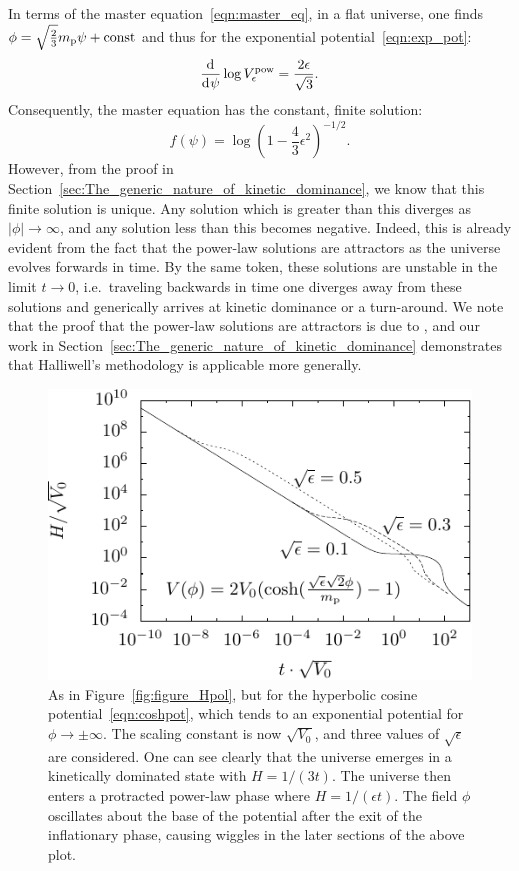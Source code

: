 In terms of the master equation~\eqref{eqn:master_eq}, in a flat universe, one finds \(\phi = \sqrt{\frac{2}{3}}m_{\mathrm{p}} \psi + \mathrm{const} \) and thus for the exponential potential~\eqref{eqn:exp_pot}:
%
\begin{equation}
  \frac{\operatorname{d}^{}\!{}}{\operatorname{d}^{}\!{\psi}} \log V^\mathrm{pow}_\epsilon = \frac{2\epsilon}{\sqrt{3}}. 
\end{equation}
%
Consequently, the master equation has the constant, finite solution:
%
\begin{equation}
  f(\psi) = \log{\left(1-\frac{4}{3}\epsilon^2\right)}^{-1/2}.
  \label{eqn:uf_power_law}
\end{equation}
%
However, from the proof in Section~\ref{sec:The_generic_nature_of_kinetic_dominance}, we know that this finite solution is unique. Any solution which is greater than this diverges as \(|\phi|\to\infty\), and any solution less than this becomes negative.  Indeed, this is already evident from the fact that the power-law solutions are attractors as the universe evolves forwards in time. By the same token, these solutions are unstable in the limit \(t \to 0\), i.e.\ traveling backwards in time one diverges away from these solutions and generically arrives at kinetic dominance or a turn-around.  We note that the proof that the power-law solutions are attractors is due to \citet{halliwell_scalar_1987}, and our work in Section~\ref{sec:The_generic_nature_of_kinetic_dominance} demonstrates that Halliwell's methodology is applicable more generally.

%
\begin{figure}[tp]
  \includegraphics[width=\textwidth]{chapters/kinetic_dominance/figures/Hlam}
  \caption{As in Figure~\protect\ref{fig:figure_Hpol}, but for the hyperbolic cosine potential~\protect\eqref{eqn:coshpot}, which tends to an exponential potential for \(\phi \to \pm\infty\). The scaling constant is now \(\sqrt{V_0}\), and three values of \(\sqrt{\epsilon}\) are considered. One can see clearly that the universe emerges in a kinetically dominated state with \(H=1/(3t)\). The universe then enters a protracted power-law phase where \(H = 1/(\epsilon t)\). The field \(\phi\) oscillates about the base of the potential after the exit of the inflationary phase, causing wiggles in the later sections of the above plot.}\label{fig:figure_Hlam}
\end{figure}
%

